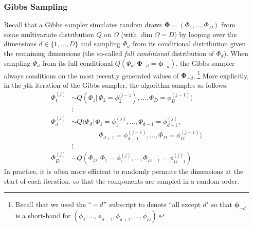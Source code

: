 \documentclass[final,3p,times,twocolumn]{elsarticle}
\let\bs\boldsymbol
\begin{document}
\subsubsection*{\normalfont \small \bfseries Gibbs Sampling}
Recall that a Gibbs sampler simulates random draws $\bs \Phi = (\Phi_1,\dots,\Phi_D)$ from some multivariate distribution $Q$ on $\Omega$ (with $\dim\Omega = D$) by looping over the dimensions $d \in \{1,\dots,D\}$ and sampling $\Phi_d$ from its conditional distribution given the remaining dimensions (the so-called \emph{full conditional} distribution of $\Phi_d$).
When sampling $\Phi_d$ from its full conditional $Q(\Phi_d|\,\bs\Phi_{-d} = \bs \phi_{-d})$, the Gibbs sampler always conditions on the most recently generated values of $\bs \Phi_{-d}$.
\footnote{Recall that we used the $``-d"$ subscript to denote ``all except $d$" so that $\bs \phi_{-d}$ is a short-hand for $(\phi_1,\dots,\phi_{d-1},\phi_{d+1},\dots,\phi_{D})$.}
More explicitly, in the $j$th iteration of the Gibbs sampler, the algorithm samples as follows:
\begin{equation}
\label{eqn:Gibbs}
\begin{split}
\Phi_1^{(j)} &\sim Q(\Phi_1|\,\Phi_2 = \phi_2^{(j-1}),\dots,\Phi_D = \phi_D^{(j-1)})\\
&\vdots\\
\Phi_d^{(j)} &\sim Q(\Phi_d|\,\Phi_1 = \phi_1^{(j)},\dots,\Phi_{d-1}=\phi_{d-1}^{(j)},\\
&\qquad\qquad \Phi_{d+1}=\phi_{d+1}^{(j-1)},\dots,\Phi_D=\phi_D^{(j-1)})\\
&\vdots\\
\Phi_D^{(j)} &\sim Q(\Phi_D|\,\Phi_1=\phi_1^{(j)},\dots,\Phi_{D-1}=\phi_{D-1}^{(j)})
\end{split}
\end{equation}
In practice, it is often more efficient to randomly permute the dimensions at the start of each iteration, so that the components are sampled in a random order.
\end{document}
